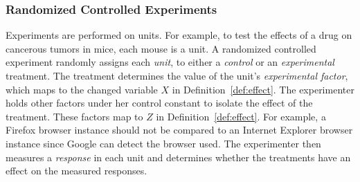 \documentclass[10pt, onecolumn]{report}
\begin{document}
\subsubsection{Randomized Controlled Experiments}

Experiments are performed on units. For example, to test the effects of a drug
on cancerous tumors in mice, each mouse is a unit. 
A randomized controlled experiment randomly assigns each \emph{ unit}, 
to either a \emph{control} or an \emph{experimental} treatment.
The treatment determines the value of the unit's \emph{experimental factor}, 
which maps to the changed variable $X$ in Definition~\ref{def:effect}.
The experimenter holds other factors under her control constant to isolate 
the effect of the treatment. These factors map to $Z$ in Definition~\ref{def:effect}.
For example, a Firefox browser instance should not be 
compared to an Internet Explorer browser instance since Google 
can detect the browser used. 
The experimenter then measures a \emph{response} in each unit and
determines whether the treatments have an effect on the measured responses.

\end{document}
